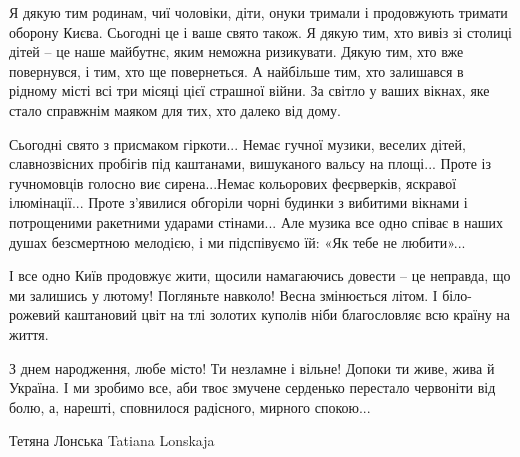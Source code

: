 Я дякую тим родинам, чиї чоловіки, діти, онуки тримали і продовжують
тримати оборону Києва. Сьогодні це і ваше свято також. Я дякую тим, хто
вивіз зі столиці дітей – це наше майбутнє, яким неможна ризикувати. Дякую
тим, хто вже повернувся, і тим, хто ще повернеться. А найбільше тим, хто
залишався в рідному місті всі три місяці цієї страшної війни. За світло у
ваших вікнах, яке стало справжнім маяком для тих, хто далеко від дому.

Сьогодні свято з присмаком гіркоти... Немає гучної музики, веселих дітей,
славнозвісних пробігів під каштанами, вишуканого вальсу на площі... Проте із
гучномовців голосно виє сирена...Немає кольорових феєрверків, яскравої
ілюмінації... Проте з'явилися обгоріли чорні будинки з вибитими вікнами і
потрощеними ракетними ударами стінами... Але музика все одно співає в наших
душах безсмертною мелодією, і ми підспівуємо їй: «Як тебе не любити»...

І все одно Київ продовжує жити, щосили намагаючись довести – це неправда, що ми
залишись у лютому! Погляньте навколо! Весна змінюється літом. І біло-рожевий
каштановий цвіт на тлі золотих куполів ніби благословляє всю країну на життя.

З днем народження, любе місто! Ти незламне і вільне! Допоки ти живе, жива
й Україна. І ми зробимо все, аби твоє змучене серденько перестало
червоніти від болю, а, нарешті, сповнилося радісного, мирного спокою...

Тетяна Лонська Tatiana Lonskaja

